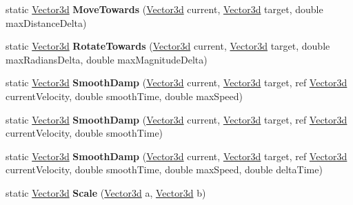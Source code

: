 \begin{DoxyCompactItemize}
static \hyperlink{struct_unity_engine_1_1_vector3d}{Vector3d} {\bfseries Move\+Towards} (\hyperlink{struct_unity_engine_1_1_vector3d}{Vector3d} current, \hyperlink{struct_unity_engine_1_1_vector3d}{Vector3d} target, double max\+Distance\+Delta)
\item 
\mbox{\label{struct_unity_engine_1_1_vector3d_a879c68adefb7c05e678bb7ef3331ddd9}} 
static \hyperlink{struct_unity_engine_1_1_vector3d}{Vector3d} {\bfseries Rotate\+Towards} (\hyperlink{struct_unity_engine_1_1_vector3d}{Vector3d} current, \hyperlink{struct_unity_engine_1_1_vector3d}{Vector3d} target, double max\+Radians\+Delta, double max\+Magnitude\+Delta)
\item 
\mbox{\label{struct_unity_engine_1_1_vector3d_af0d5c130168731e106ee29cd28b4fcad}} 
static \hyperlink{struct_unity_engine_1_1_vector3d}{Vector3d} {\bfseries Smooth\+Damp} (\hyperlink{struct_unity_engine_1_1_vector3d}{Vector3d} current, \hyperlink{struct_unity_engine_1_1_vector3d}{Vector3d} target, ref \hyperlink{struct_unity_engine_1_1_vector3d}{Vector3d} current\+Velocity, double smooth\+Time, double max\+Speed)
\item 
\mbox{\label{struct_unity_engine_1_1_vector3d_a6113aa76098dd0da6220b80b4a6464c3}} 
static \hyperlink{struct_unity_engine_1_1_vector3d}{Vector3d} {\bfseries Smooth\+Damp} (\hyperlink{struct_unity_engine_1_1_vector3d}{Vector3d} current, \hyperlink{struct_unity_engine_1_1_vector3d}{Vector3d} target, ref \hyperlink{struct_unity_engine_1_1_vector3d}{Vector3d} current\+Velocity, double smooth\+Time)
\item 
\mbox{\label{struct_unity_engine_1_1_vector3d_a1ded5a47fb1d44849038b5268528d4e2}} 
static \hyperlink{struct_unity_engine_1_1_vector3d}{Vector3d} {\bfseries Smooth\+Damp} (\hyperlink{struct_unity_engine_1_1_vector3d}{Vector3d} current, \hyperlink{struct_unity_engine_1_1_vector3d}{Vector3d} target, ref \hyperlink{struct_unity_engine_1_1_vector3d}{Vector3d} current\+Velocity, double smooth\+Time, double max\+Speed, double delta\+Time)
\item 
\mbox{\label{struct_unity_engine_1_1_vector3d_ad926a6c3cd992e7a5a32a40eea40aebd}} 
static \hyperlink{struct_unity_engine_1_1_vector3d}{Vector3d} {\bfseries Scale} (\hyperlink{struct_unity_engine_1_1_vector3d}{Vector3d} a, \hyperlink{struct_unity_engine_1_1_vector3d}{Vector3d} b)

\end{DoxyCompactItemize}
